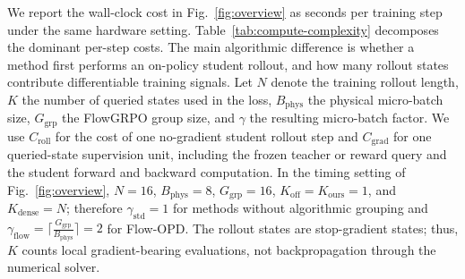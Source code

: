 We report the wall-clock cost in Fig.~\ref{fig:overview} as seconds per training step under the same hardware setting. Table~\ref{tab:compute-complexity} decomposes the dominant per-step costs. The main algorithmic difference is whether a method first performs an on-policy student rollout, and how many rollout states contribute differentiable training signals. Let $N$ denote the training rollout length, $K$ the number of queried states used in the loss, $B_{\mathrm{phys}}$ the physical micro-batch size, $G_{\mathrm{grp}}$ the FlowGRPO group size, and $\gamma$ the resulting micro-batch factor. We use $C_{\mathrm{roll}}$ for the cost of one no-gradient student rollout step and $C_{\mathrm{grad}}$ for one queried-state supervision unit, including the frozen teacher or reward query and the student forward and backward computation. In the timing setting of Fig.~\ref{fig:overview}, $N{=}16$, $B_{\mathrm{phys}}{=}8$, $G_{\mathrm{grp}}{=}16$, $K_{\mathrm{off}}{=}K_{\mathrm{ours}}{=}1$, and $K_{\mathrm{dense}}{=}N$; therefore $\gamma_{\mathrm{std}}{=}1$ for methods without algorithmic grouping and $\gamma_{\mathrm{flow}}{=}\lceil \frac{G_{\mathrm{grp}}}{B_{\mathrm{phys}}}\rceil{=}2$ for Flow-OPD. The rollout states are stop-gradient states; thus, $K$ counts local gradient-bearing evaluations, not backpropagation through the numerical solver.


\begin{table}[t]
  \centering
  \footnotesize
  \caption{\textbf{Configuration of Per-Step Computational Complexity.} All on-policy variants use the same $N$-step training rollout. The batch factor records extra micro-batches required by algorithmic grouping when the group does not fit in one physical micro-batch.}
  \label{tab:compute-complexity}
\end{table}

